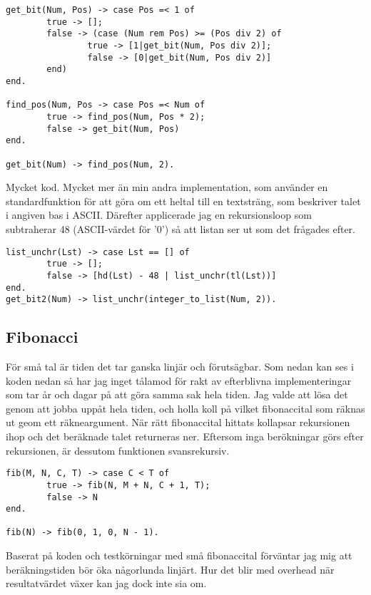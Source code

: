 \documentclass[a4paper, 11pt]{article}
\begin{document}
\begin{verbatim}
get_bit(Num, Pos) -> case Pos =< 1 of
        true -> [];
        false -> (case (Num rem Pos) >= (Pos div 2) of
                true -> [1|get_bit(Num, Pos div 2)];
                false -> [0|get_bit(Num, Pos div 2)]
        end)
end.

find_pos(Num, Pos -> case Pos =< Num of
        true -> find_pos(Num, Pos * 2);
        false -> get_bit(Num, Pos)
end.

get_bit(Num) -> find_pos(Num, 2).
\end{verbatim}

Mycket kod. Mycket mer än min andra implementation, som använder en standardfunktion för att göra om ett heltal till en textsträng, som beskriver talet i angiven bas i ASCII. Därefter applicerade jag en rekursionsloop som subtraherar 48 (ASCII-värdet för '0') så att listan ser ut som det frågades efter.

\begin{verbatim}
list_unchr(Lst) -> case Lst == [] of
        true -> [];
        false -> [hd(Lst) - 48 | list_unchr(tl(Lst))]
end.
get_bit2(Num) -> list_unchr(integer_to_list(Num, 2)).
\end{verbatim}

\subsection{Fibonacci}

För små tal är tiden det tar ganska linjär och förutsägbar. Som nedan kan ses i koden nedan så har jag inget tålamod för rakt av efterblivna implementeringar som tar år och dagar på att göra samma sak hela tiden. Jag valde att lösa det genom att jobba uppåt hela tiden, och holla koll på vilket fibonaccital som räknas ut geom ett räkneargument. När rätt fibonaccital hittats kollapsar rekursionen ihop och det beräknade talet returneras ner. Eftersom inga berökningar görs efter rekursionen, är dessutom funktionen svansrekursiv.

\begin{verbatim}
fib(M, N, C, T) -> case C < T of
        true -> fib(N, M + N, C + 1, T);
        false -> N
end.

fib(N) -> fib(0, 1, 0, N - 1).
\end{verbatim}

Baserat på koden och testkörningar med små fibonaccital förväntar jag mig att beräkningstiden bör öka någorlunda linjärt. Hur det blir med overhead när resultatvärdet växer kan jag dock inte sia om.
\end{document}
